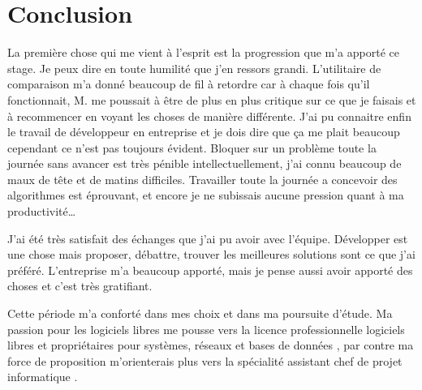 \chapter{Conclusion} %
\label{cha:Conclusion}

La première chose qui me vient à l'esprit est la progression que m'a apporté ce
stage. Je peux dire en toute humilité que j'en ressors grandi. L'utilitaire de
comparaison m'a donné beaucoup de fil à retordre car à chaque fois qu'il
fonctionnait, M. me poussait à être de plus en plus critique sur
ce que je faisais et à recommencer en voyant les choses de manière différente.
J'ai pu connaitre enfin le travail de développeur en entreprise et je dois dire
que ça me plait beaucoup cependant ce n'est pas toujours évident. Bloquer sur
un problème toute la journée sans avancer est très pénible intellectuellement,
j'ai connu beaucoup de maux de tête et de matins difficiles. Travailler toute
la journée a concevoir des algorithmes est éprouvant, et encore je ne subissais
aucune pression quant à ma productivité\dots

J'ai été très satisfait des échanges que j'ai pu avoir avec l'équipe.
Développer est une chose mais proposer, débattre, trouver les meilleures
solutions sont ce que j'ai préféré. L'entreprise m'a beaucoup apporté, mais je
pense aussi avoir apporté des choses et c'est très gratifiant.

Cette période m'a conforté dans mes choix et dans ma poursuite d'étude. Ma
passion pour les logiciels libres me pousse vers la licence professionnelle \og
logiciels libres et propriétaires pour systèmes, réseaux et bases de données
\fg{}, par contre ma force de proposition m'orienterais plus vers la \og
spécialité assistant chef de projet informatique \fg{}.
